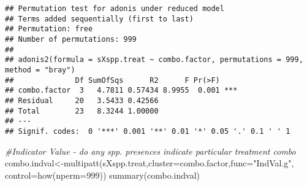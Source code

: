 \documentclass[
]{article}
\newenvironment{Shaded}{\begin{snugshade}}{\end{snugshade}}
\newcommand{\AttributeTok}[1]{\textcolor[rgb]{0.77,0.63,0.00}{#1}}
\newcommand{\CommentTok}[1]{\textcolor[rgb]{0.56,0.35,0.01}{\textit{#1}}}
\newcommand{\DecValTok}[1]{\textcolor[rgb]{0.00,0.00,0.81}{#1}}
\newcommand{\FunctionTok}[1]{\textcolor[rgb]{0.00,0.00,0.00}{#1}}
\newcommand{\NormalTok}[1]{#1}
\newcommand{\OtherTok}[1]{\textcolor[rgb]{0.56,0.35,0.01}{#1}}
\newcommand{\StringTok}[1]{\textcolor[rgb]{0.31,0.60,0.02}{#1}}
\begin{document}
\begin{verbatim}
## Permutation test for adonis under reduced model
## Terms added sequentially (first to last)
## Permutation: free
## Number of permutations: 999
## 
## adonis2(formula = sXspp.treat ~ combo.factor, permutations = 999, method = "bray")
##              Df SumOfSqs      R2      F Pr(>F)    
## combo.factor  3   4.7811 0.57434 8.9955  0.001 ***
## Residual     20   3.5433 0.42566                  
## Total        23   8.3244 1.00000                  
## ---
## Signif. codes:  0 '***' 0.001 '**' 0.01 '*' 0.05 '.' 0.1 ' ' 1
\end{verbatim}

\begin{Shaded}
\begin{Highlighting}[]
\CommentTok{\#Indicator Value {-} do any spp. presences indicate particular treatment combo}
\NormalTok{combo.indval}\OtherTok{\textless{}{-}}\FunctionTok{multipatt}\NormalTok{(sXspp.treat,}\AttributeTok{cluster=}\NormalTok{combo.factor,}\AttributeTok{func=}\StringTok{"IndVal.g"}\NormalTok{,}
                        \AttributeTok{control=}\FunctionTok{how}\NormalTok{(}\AttributeTok{nperm=}\DecValTok{999}\NormalTok{))}
\FunctionTok{summary}\NormalTok{(combo.indval)}
\end{Highlighting}
\end{Shaded}
\end{document}

